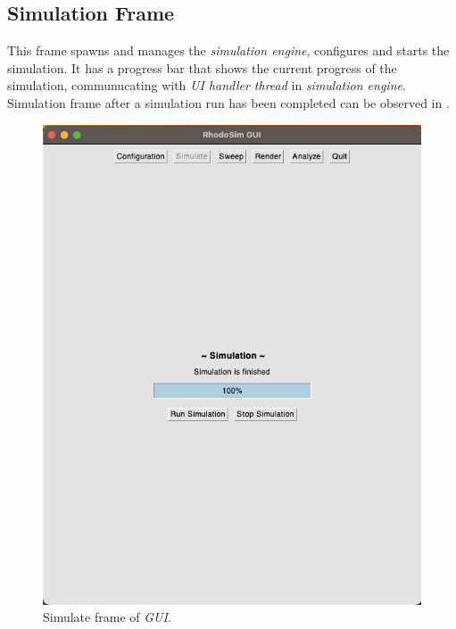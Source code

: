 \documentclass[a4paper,oneside,12pt]{report}
\numberwithin{equation}{chapter}
\begin{document}
\subsection{Simulation Frame}
This frame spawns and manages the \textit{simulation engine}, configures and starts the simulation. 
It has a progress bar that shows the current progress of the simulation, communucating with \textit{UI handler thread} in \textit{simulation engine}.
Simulation frame after a simulation run has been completed can be observed in .
\begin{figure}
    \centering
    \includegraphics[width=\linewidth]{./figures/rhodoSim/GUI_simulate_frame.png}
    \caption{Simulate frame of \textit{GUI}.}
    \label{fig:gui_simulate_1}
\end{figure}
\end{document}
